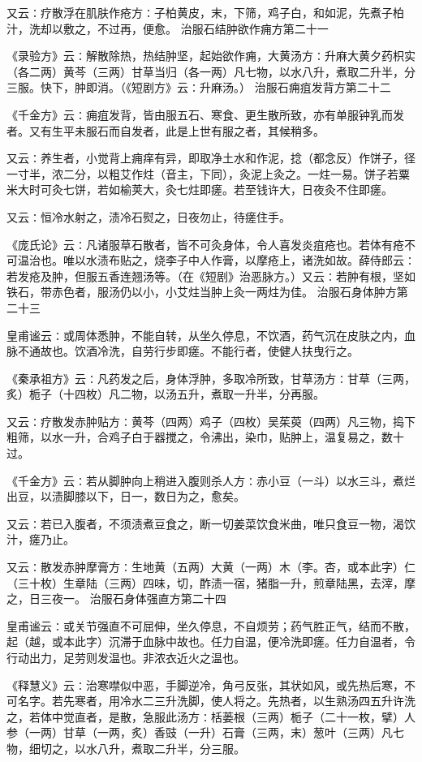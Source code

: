 \documentclass[a4paper,12pt,UTF8,twoside]{ctexbook}
\begin{document}
又云∶疗散浮在肌肤作疮方∶子柏黄皮，末，下筛，鸡子白，和如泥，先煮子柏汁，洗却以敷之，不过再，便愈。
治服石结肿欲作痈方第二十一

《录验方》云∶解散除热，热结肿坚，起始欲作痈，大黄汤方∶升麻大黄夕药枳实（各二两）黄芩（三两）甘草当归（各一两）凡七物，以水八升，煮取二升半，分三服。快下，肿即消。（《短剧方》云∶升麻汤。）
治服石痈疽发背方第二十二

《千金方》云∶痈疽发背，皆由服五石、寒食、更生散所致，亦有单服钟乳而发者。又有生平未服石而自发者，此是上世有服之者，其候稍多。

又云∶养生者，小觉背上痈痒有异，即取净土水和作泥，捻（都念反）作饼子，径一寸半，浓二分，以粗艾作炷（音主，下同），灸泥上灸之。一炷一易。饼子若粟米大时可灸七饼，若如榆荚大，灸七炷即瘥。若至钱许大，日夜灸不住即瘥。

又云∶恒冷水射之，渍冷石熨之，日夜勿止，待瘥住手。

《庞氏论》云∶凡诸服草石散者，皆不可灸身体，令人喜发炎疽疮也。若体有疮不可温治也。唯以水渍布贴之，烧李子中人作膏，以摩疮上，诸洗如故。薛侍郎云∶若发疮及肿，但服五香连翘汤等。（在《短剧》治恶脉方。）又云∶若肿有根，坚如铁石，带赤色者，服汤仍以小，小艾炷当肿上灸一两炷为佳。
治服石身体肿方第二十三

皇甫谧云∶或周体悉肿，不能自转，从坐久停息，不饮酒，药气沉在皮肤之内，血脉不通故也。饮酒冷洗，自劳行步即瘥。不能行者，使健人扶曳行之。

《秦承祖方》云∶凡药发之后，身体浮肿，多取冷所致，甘草汤方∶甘草（三两，炙）栀子（十四枚）凡二物，以汤五升，煮取一升半，分再服。

又云∶疗散发赤肿贴方∶黄芩（四两）鸡子（四枚）吴茱萸（四两）凡三物，捣下粗筛，以水一升，合鸡子白于器搅之，令沸出，染巾，贴肿上，温复易之，数十过。

《千金方》云∶若从脚肿向上稍进入腹则杀人方∶赤小豆（一斗）以水三斗，煮烂出豆，以渍脚膝以下，日一，数日为之，愈矣。

又云∶若已入腹者，不须渍煮豆食之，断一切姜菜饮食米曲，唯只食豆一物，渴饮汁，瘥乃止。

又云∶散发赤肿摩膏方∶生地黄（五两）大黄（一两）木（李。杏，或本此字）仁（三十枚）生章陆（三两）四味，切，酢渍一宿，猪脂一升，煎章陆黑，去滓，摩之，日三夜一。
治服石身体强直方第二十四

皇甫谧云∶或关节强直不可屈伸，坐久停息，不自烦劳；药气胜正气，结而不散，起（越，或本此字）沉滞于血脉中故也。任力自温，便冷洗即瘥。任力自温者，令行动出力，足劳则发温也。非浓衣近火之温也。

《释慧义》云∶治寒噤似中恶，手脚逆冷，角弓反张，其状如风，或先热后寒，不可名字。若先寒者，用冷水二三升洗脚，使人将之。先热者，以生熟汤四五升许洗之，若体中觉直者，是散，急服此汤方∶栝蒌根（三两）栀子（二十一枚，擘）人参（一两）甘草（一两，炙）香豉（一升）石膏（三两，末）葱叶（三两）凡七物，细切之，以水八升，煮取二升半，分三服。
\end{document}
